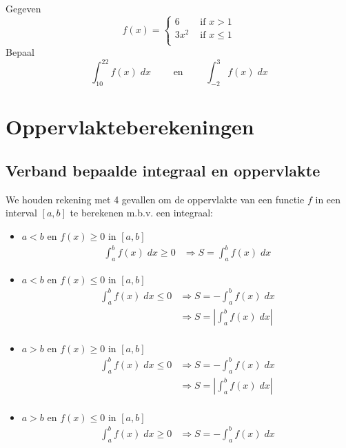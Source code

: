 \documentclass[a4paper,12pt, twoside]{article}
\begin{document}
\begin{oefening} %
Gegeven
$$f(x)=\begin{cases}6 & \mbox{ if } x > 1\\3x^2 & \mbox{ if } x \leq 1\\\end{cases}$$
Bepaal
$$\displaystyle \int_{10}^{22} f(x) \;dx \qquad\mbox{ en }\qquad \displaystyle \int_{-2}^{3} f(x) \;dx$$
\end{oefening}

\cleardoublepage
\section{Oppervlakteberekeningen}

\subsection{Verband bepaalde integraal en oppervlakte}

We houden rekening met 4 gevallen om de oppervlakte van een functie $f$ in een interval $[a,b]$ te berekenen m.b.v. een integraal:
\begin{itemize}
  \item $a<b$ en $f(x)\geq0$ in $[a,b]$
  \begin{align*}
    \int_a^b f(x)\; dx \geq 0 &\Rightarrow S=\int_a^b f(x)\; dx
  \end{align*}
  \item $a<b$ en $f(x)\leq0$ in $[a,b]$
  \begin{align*}
    \int_a^b f(x)\; dx \leq 0 &\Rightarrow S=-\int_a^b f(x)\; dx\\
                              &\Rightarrow S=|\int_a^b f(x)\; dx|\\
  \end{align*}
  \item $a>b$ en $f(x)\geq0$ in $[a,b]$
  \begin{align*}
    \int_a^b f(x)\; dx \leq 0 &\Rightarrow S=-\int_a^b f(x)\; dx\\
                              &\Rightarrow S=|\int_a^b f(x)\; dx|\\
  \end{align*}
  \item $a>b$ en $f(x)\leq0$ in $[a,b]$
  \begin{align*}
    \int_a^b f(x)\; dx \geq 0 &\Rightarrow S=-\int_a^b f(x)\; dx
  \end{align*}
\end{itemize}
\end{document}

